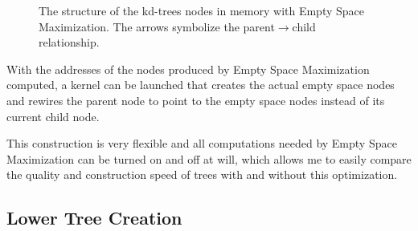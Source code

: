 \begin{figure}
  \centering
  \caption[The structure of the kd-trees nodes in memory with Empty Space
    Maximization.]{The structure of the kd-trees nodes in memory with Empty
    Space Maximization. The arrows symbolize the parent$\rightarrow$child
    relationship.}
  \label{fig:emptyNodeStructure}
\end{figure}



With the addresses of the nodes produced by Empty Space Maximization computed, a
kernel can be launched that creates the actual empty space nodes and rewires the
parent node to point to the empty space nodes instead of its current child node.

This construction is very flexible and all computations needed by Empty Space
Maximization can be turned on and off at will, which allows me to easily compare
the quality and construction speed of trees with and without this optimization.

\subsection{Lower Tree Creation}\label{sec:lowerNodes}

